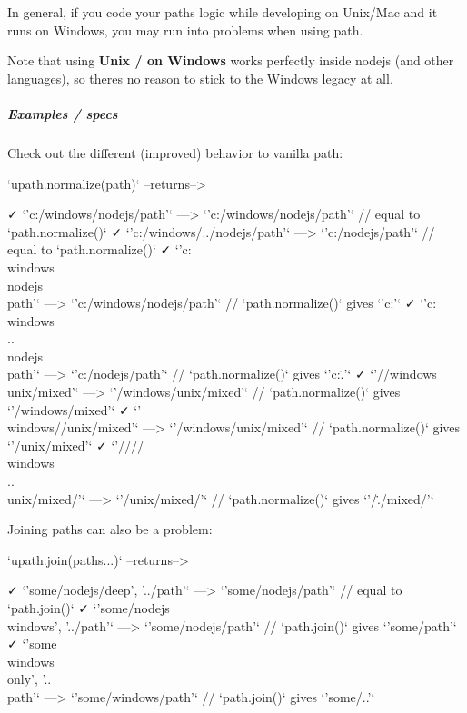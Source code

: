 In general, if you code your paths logic while developing on Unix/\+Mac and it runs on Windows, you may run into problems when using {\ttfamily path}.

Note that using {\bfseries Unix {\ttfamily /} on Windows} works perfectly inside nodejs (and other languages), so there\textquotesingle{}s no reason to stick to the Windows legacy at all.

\subparagraph*{Examples / specs}

Check out the different (improved) behavior to vanilla {\ttfamily path}\+: \begin{DoxyVerb}`upath.normalize(path)`        --returns-->

      ✓ `'c:/windows/nodejs/path'`           --->      `'c:/windows/nodejs/path'`  // equal to `path.normalize()`
      ✓ `'c:/windows/../nodejs/path'`        --->              `'c:/nodejs/path'`  // equal to `path.normalize()`
      ✓ `'c:\\windows\\nodejs\\path'`        --->      `'c:/windows/nodejs/path'`  // `path.normalize()` gives `'c:\windows\nodejs\path'`
      ✓ `'c:\\windows\\..\\nodejs\\path'`    --->              `'c:/nodejs/path'`  // `path.normalize()` gives `'c:\windows\..\nodejs\path'`
      ✓ `'//windows\\unix/mixed'`            --->         `'/windows/unix/mixed'`  // `path.normalize()` gives `'/windows\unix/mixed'`
      ✓ `'\\windows//unix/mixed'`            --->         `'/windows/unix/mixed'`  // `path.normalize()` gives `'\windows/unix/mixed'`
      ✓ `'////\\windows\\..\\unix/mixed/'`   --->                `'/unix/mixed/'`  // `path.normalize()` gives `'/\windows\..\unix/mixed/'`
\end{DoxyVerb}


Joining paths can also be a problem\+: \begin{DoxyVerb}`upath.join(paths...)`        --returns-->

      ✓ `'some/nodejs/deep', '../path'`       --->       `'some/nodejs/path'`  // equal to `path.join()`
      ✓ `'some/nodejs\\windows', '../path'`   --->       `'some/nodejs/path'`  // `path.join()` gives `'some/path'`
      ✓ `'some\\windows\\only', '..\\path'`   --->      `'some/windows/path'`  // `path.join()` gives `'some\windows\only/..\path'`
\end{DoxyVerb}


